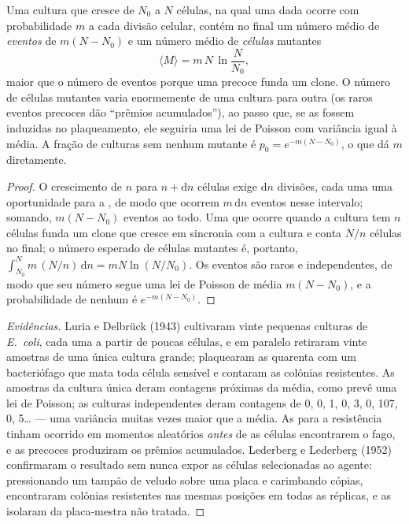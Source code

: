 \begin{theorem}\label{thm:b2:genome-diversification:luria}
Uma cultura que cresce de $N_0$ a $N$ células, na qual uma dada
 ocorre com probabilidade $m$ a cada divisão celular, contém
no final um número médio de \emph{eventos} de  $m(N - N_0)$ e
um número médio de \emph{células} mutantes
\[
\langle M\rangle = m\,N\,\ln\frac{N}{N_0},
\]
maior que o número de eventos porque uma  precoce funda um
clone. O número de células mutantes varia enormemente de uma cultura
para outra (os raros eventos precoces dão ``prêmios acumulados''), ao
passo que, se as  fossem induzidas no plaqueamento, ele
seguiria uma lei de Poisson com variância igual à média. A fração de
culturas sem nenhum mutante é $p_0 = e^{-m(N - N_0)}$, o que dá $m$
diretamente.
\end{theorem}
\begin{proof}
O crescimento de $n$ para $n + \mathrm{d}n$ células exige
$\mathrm{d}n$ divisões, cada uma uma oportunidade para a , de
modo que ocorrem $m\,\mathrm{d}n$ eventos nesse intervalo; somando,
$m(N - N_0)$ eventos ao todo. Uma  que ocorre quando a cultura
tem $n$ células funda um clone que cresce em sincronia com a cultura e
conta $N/n$ células no final; o número esperado de células mutantes é,
portanto,
$\int_{N_0}^{N} m\,(N/n)\,\mathrm{d}n = mN\ln(N/N_0)$. Os eventos são
raros e independentes, de modo que seu número segue uma lei de Poisson
de média $m(N - N_0)$, e a probabilidade de nenhum é
$e^{-m(N - N_0)}$.
\end{proof}
\begin{proof}[Evidências]
Luria e Delbrück (1943) cultivaram vinte pequenas culturas de
\emph{E.~coli}, cada uma a partir de poucas células, e em paralelo
retiraram vinte amostras de uma única cultura grande; plaquearam as
quarenta com um bacteriófago que mata toda célula sensível e contaram
as colônias resistentes. As amostras da cultura única deram contagens
próximas da média, como prevê uma lei de Poisson; as culturas
independentes deram contagens de 0, 0, 1, 0, 3, 0, 107, 0, 5\dots{}
--- uma variância muitas vezes maior que a média. As  para a
resistência tinham ocorrido em momentos aleatórios \emph{antes} de as
células encontrarem o fago, e as precoces produziram os prêmios
acumulados. Lederberg e Lederberg (1952) confirmaram o resultado sem
nunca expor as células selecionadas ao agente: pressionando um
tampão de veludo sobre uma placa e carimbando cópias, encontraram
colônias resistentes nas mesmas posições em todas as réplicas, e as
isolaram da placa-mestra não tratada.
\end{proof}


